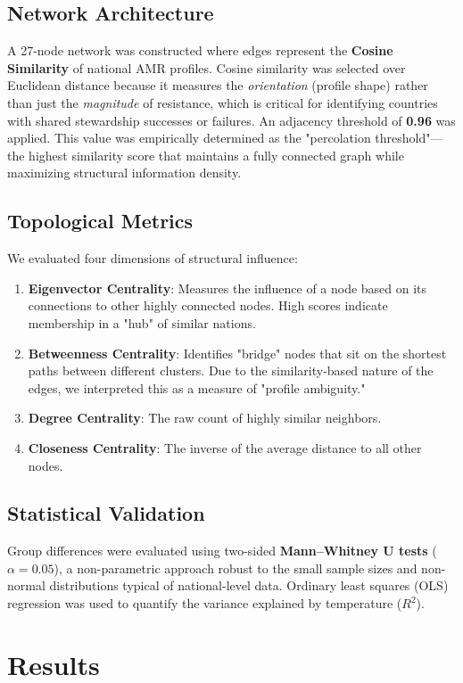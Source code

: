 \documentclass[11pt,a4paper]{article}
\begin{document}
\subsection{Network Architecture}
A 27-node network was constructed where edges represent the \textbf{Cosine Similarity} of national AMR profiles. Cosine similarity was selected over Euclidean distance because it measures the \textit{orientation} (profile shape) rather than just the \textit{magnitude} of resistance, which is critical for identifying countries with shared stewardship successes or failures.
An adjacency threshold of \textbf{0.96} was applied. This value was empirically determined as the "percolation threshold"—the highest similarity score that maintains a fully connected graph while maximizing structural information density.

\subsection{Topological Metrics}
We evaluated four dimensions of structural influence:
\begin{enumerate}
    \item \textbf{Eigenvector Centrality}: Measures the influence of a node based on its connections to other highly connected nodes. High scores indicate membership in a "hub" of similar nations.
    \item \textbf{Betweenness Centrality}: Identifies "bridge" nodes that sit on the shortest paths between different clusters. Due to the similarity-based nature of the edges, we interpreted this as a measure of "profile ambiguity."
    \item \textbf{Degree Centrality}: The raw count of highly similar neighbors.
    \item \textbf{Closeness Centrality}: The inverse of the average distance to all other nodes.
\end{enumerate}

\subsection{Statistical Validation}
Group differences were evaluated using two-sided \textbf{Mann–Whitney U tests} ($\alpha=0.05$), a non-parametric approach robust to the small sample sizes and non-normal distributions typical of national-level data. Ordinary least squares (OLS) regression was used to quantify the variance explained by temperature ($R^2$).

\section{Results} \label{res}
\end{document}
